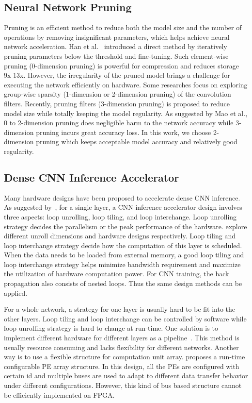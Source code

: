 \subsection{Neural Network Pruning}
Pruning is an efficient method to reduce both the model size and the number of operations by removing insignificant parameters, which helps achieve neural network acceleration. Han et al.~\cite{han2015learning} introduced a direct method by iteratively pruning parameters below the threshold and fine-tuning. Such element-wise pruning (0-dimension pruning) is powerful for compression and reduces storage 9x-13x. However, the irregularity of the pruned model brings a challenge for executing the network efficiently on hardware. Some researches focus on exploring group-wise sparsity (1-dimension or 2-dimension pruning)\cite{lebedev2016fast,zhou2016less,wen2016learning} of the convolution filters. Recently, pruning filters (3-dimension pruning)\cite{molchanov2016pruning,li2016pruning} is proposed to reduce model size while totally keeping the model regularity. As suggested by Mao et al.\cite{mao2017exploring}, 0 to 2-dimension pruning does negligible harm to the network accuracy while 3-dimension pruning incurs great accuracy loss. In this work, we choose 2-dimension pruning which keeps acceptable model accuracy and relatively good regularity.

\subsection{Dense CNN Inference Accelerator}\label{sec:rw_dense}
Many hardware designs have been proposed to accelerate dense CNN inference. As suggested by~\cite{ma2017optimizing}, for a single layer, a CNN inference accelerator design involves three aspects: loop unrolling, loop tiling, and loop interchange. Loop unrolling strategy decides the parallelism or the peak performance of the hardware. \cite{zhang2015optimizing, du2015shidiannao, qiu2016going} explore different unroll dimensions and hardware designs respectively. Loop tiling and loop interchange strategy decide how the computation of this layer is scheduled. When the data needs to be loaded from external memory, a good loop tiling and loop interchange strategy helps minimize bandwidth requirement and maximize the utilization of hardware computation power. For CNN training, the back propagation also consists of nested loops. Thus the same design methods can be applied.

For a whole network, a strategy for one layer is usually hard to be fit into the other layers. Loop tiling and loop interchange can be controlled by software while loop unrolling strategy is hard to change at run-time. One solution is to implement different hardware for different layers as a pipeline~\cite{Li2016High}. This method is usually resource consuming and lacks flexibility for different networks. Another way is to use a flexible structure for computation unit array. \cite{chen2016eyeriss} proposes a run-time configurable PE array structure. In this design, all the PEs are configured with certain id and multiple buses are used to adapt to different data transfer behavior under different configurations. However, this kind of bus based structure cannot be efficiently implemented on FPGA.

